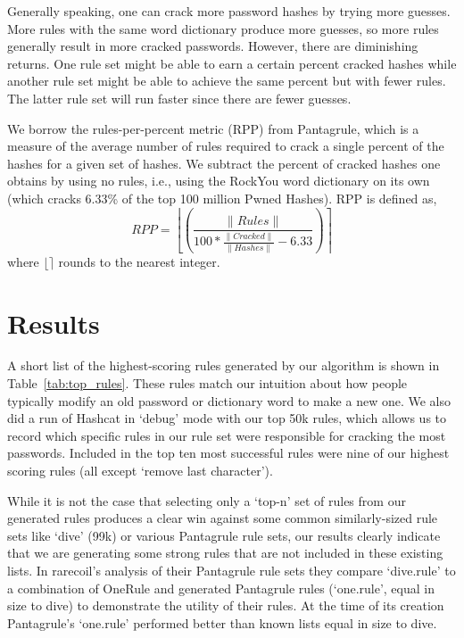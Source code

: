 \documentclass[letterpaper,twocolumn,10pt]{article}
\begin{document}
Generally speaking, one can crack more password hashes by trying more guesses.
More rules with the same word dictionary produce more guesses, so more rules
generally result in more cracked passwords. However, there are diminishing
returns. One rule set might be able to earn a certain percent cracked hashes
while another rule set might be able to achieve the same percent but with fewer
rules. The latter rule set will run faster since there are fewer guesses.

We borrow the rules-per-percent metric (RPP) from Pantagrule\cite{pantagrule},
which is a measure of the average number of rules required to crack a single
percent of the hashes for a given set of hashes. We subtract the percent of
cracked hashes one obtains by using no rules, i.e., using the RockYou
word dictionary on its own (which cracks 6.33\% of the top 100 million Pwned
Hashes). RPP is defined as,
\begin{equation*}
RPP =\left\lfloor\left(\frac{\|Rules\|}{100*\frac{\|Cracked\|}{\|Hashes\|} -
6.33}\right)\right\rceil
\end{equation*}
where $\lfloor\rceil$ rounds to the nearest integer.

\section{Results}
\label{sec:results}

A short list of the highest-scoring rules generated by our algorithm is shown
in Table~\ref{tab:top_rules}. These rules match our intuition about how people
typically modify an old password or dictionary word to make a new one. We also
did a run of Hashcat in `debug' mode with our top 50k rules, which allows us to
record which specific rules in our rule set were responsible for cracking the most
passwords. Included in the top ten most successful rules were nine of our
highest scoring rules (all except `remove last character').


While it is not the case that selecting only a `top-n' set of rules from our
generated rules produces a clear win against some common similarly-sized
rule sets like `dive' (99k) or various Pantagrule rule sets, our results
clearly indicate that we are generating some strong rules that are not included
in these existing lists. In rarecoil's analysis of their Pantagrule rule sets
they compare `dive.rule' to a combination of OneRule and generated Pantagrule
rules (`one.rule', equal in size to dive) to demonstrate the utility of their
rules. At the time of its creation Pantagrule's `one.rule' performed better than
known lists equal in size to dive.
\end{document}
